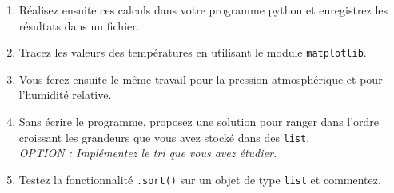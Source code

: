 \begin{enumerate}
\item Réalisez ensuite ces calculs dans votre programme python et enregistrez les résultats dans un fichier.

\item Tracez les valeurs des températures en utilisant le module \texttt{matplotlib}.

\item Vous ferez ensuite le même travail pour la pression atmosphérique et pour l'humidité relative.

\item Sans écrire le programme, proposez une solution pour ranger dans l'ordre croissant
  les grandeurs que vous avez stocké dans des \texttt{list}.\\
  \textit{OPTION : Implémentez le tri que vous avez étudier.}

\item Testez la fonctionnalité \texttt{.sort()} sur un objet de type \texttt{list} et commentez.

\end{enumerate}
